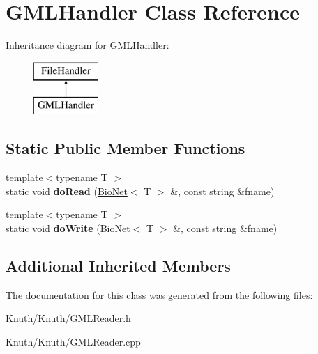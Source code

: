 \hypertarget{class_g_m_l_handler}{}\section{G\+M\+L\+Handler Class Reference}
\label{class_g_m_l_handler}
Inheritance diagram for G\+M\+L\+Handler\+:\begin{figure}[H]
\begin{center}
\leavevmode
\includegraphics[height=2.000000cm]{class_g_m_l_handler}
\end{center}
\end{figure}
\subsection*{Static Public Member Functions}
\begin{DoxyCompactItemize}
\item 
\mbox{\label{class_g_m_l_handler_a421ba270909a741ba0cfa0e9ea1a0193}} 
{\footnotesize template$<$typename T $>$ }\\static void {\bfseries do\+Read} (\hyperlink{class_bio_net}{Bio\+Net}$<$ T $>$ \&, const string \&fname)
\item 
\mbox{\label{class_g_m_l_handler_a94591c1af1a83cc546216553bc95d01a}} 
{\footnotesize template$<$typename T $>$ }\\static void {\bfseries do\+Write} (\hyperlink{class_bio_net}{Bio\+Net}$<$ T $>$ \&, const string \&fname)
\end{DoxyCompactItemize}
\subsection*{Additional Inherited Members}


The documentation for this class was generated from the following files\+:\begin{DoxyCompactItemize}
\item 
Knuth/\+Knuth/G\+M\+L\+Reader.\+h\item 
Knuth/\+Knuth/G\+M\+L\+Reader.\+cpp\end{DoxyCompactItemize}
